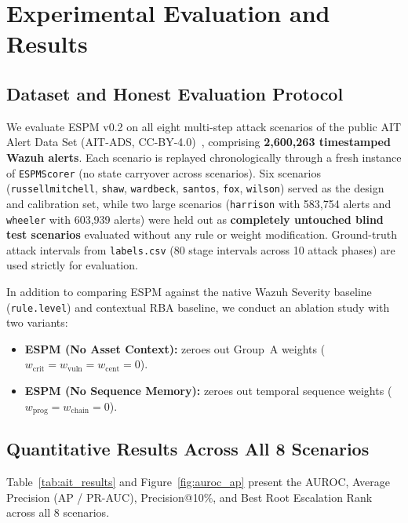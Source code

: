 %
%
\chapter{Experimental Evaluation and Results}
\label{chap:03}
\setlength{\parskip}{0.8em}

\section{Dataset and Honest Evaluation Protocol}
We evaluate ESPM v0.2 on all eight multi-step attack scenarios of the public AIT Alert Data Set (AIT-ADS, CC-BY-4.0)~\cite{Landauer2023}, comprising \textbf{2,600,263 timestamped Wazuh alerts}. Each scenario is replayed chronologically through a fresh instance of \texttt{ESPMScorer} (no state carryover across scenarios). Six scenarios (\texttt{russellmitchell}, \texttt{shaw}, \texttt{wardbeck}, \texttt{santos}, \texttt{fox}, \texttt{wilson}) served as the design and calibration set, while two large scenarios (\texttt{harrison} with 583,754 alerts and \texttt{wheeler} with 603,939 alerts) were held out as \textbf{completely untouched blind test scenarios} evaluated without any rule or weight modification. Ground-truth attack intervals from \texttt{labels.csv} (80 stage intervals across 10 attack phases) are used strictly for evaluation.

In addition to comparing ESPM against the native Wazuh Severity baseline (\texttt{rule.level}) and contextual RBA baseline, we conduct an ablation study with two variants:
\begin{itemize}
    \item \textbf{ESPM (No Asset Context):} zeroes out Group~A weights ($w_{\text{crit}}=w_{\text{vuln}}=w_{\text{cent}}=0$).
    \item \textbf{ESPM (No Sequence Memory):} zeroes out temporal sequence weights ($w_{\text{prog}}=w_{\text{chain}}=0$).
\end{itemize}

\section{Quantitative Results Across All 8 Scenarios}
Table~\ref{tab:ait_results} and Figure~\ref{fig:auroc_ap} present the AUROC, Average Precision (AP / PR-AUC), Precision@10\%, and Best Root Escalation Rank across all 8 scenarios.

